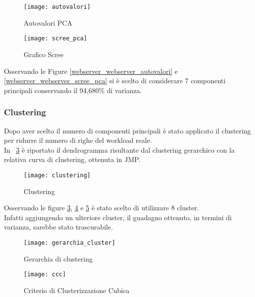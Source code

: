 \begin{figure}[!htbp]
  \centering
  \texttt{[image: autovalori]}
  \caption{Autovalori PCA}
  \label{webserver_autovalori}
\end{figure}
\clearpage

\begin{figure}[!htbp]
  \centering
  \texttt{[image: scree\_pca]}
  \caption{Grafico Scree}
  \label{webserver_scree_pca}
\end{figure}

Osservando le Figure \ref{webserver_webserver_autovalori} e \ref{webserver_webserver_scree_pca} si è scelto di considerare
7 componenti principali conservando il 94,680\% di varianza.

\clearpage

\subsubsection{Clustering}
Dopo aver scelto il numero di componenti principali è stato applicato il clustering
per ridurre il numero di righe del workload reale.\\
In \figurename~\ref{webserver_clustering} è riportato il dendrogramma risultante dal
clustering gerarchico con la relativa curva di clustering, ottenuta in JMP.\\

\begin{figure}[!htbp]
  \centering
  \texttt{[image: clustering]}
  \caption{Clustering}
  \label{webserver_clustering}
\end{figure}
\clearpage

Osservando le figure \ref{webserver_clustering}, \ref{webserver_gerarchia_cluster} e \ref{webserver_ccc}
è stato scelto di utilizzare 8 cluster.\\
Infatti aggiungendo un ulteriore cluster, il guadagno ottenuto, in termini di varianza,
sarebbe stato trascurabile.\\

\begin{minipage}{\linewidth}
  \centering
  \begin{minipage}{0.48\linewidth}
    \begin{figure}[H]
      \texttt{[image: gerarchia\_cluster]}
      \label{webserver_gerarchia_cluster}
      \caption{Gerarchia di clustering}
    \end{figure}
  \end{minipage}
  \begin{minipage}{0.48\linewidth}
    \begin{figure}[H]
      \texttt{[image: ccc]}
      \label{webserver_ccc}
      \caption{Criterio di Clusterizzazione Cubica}
    \end{figure}
  \end{minipage}
\end{minipage}


